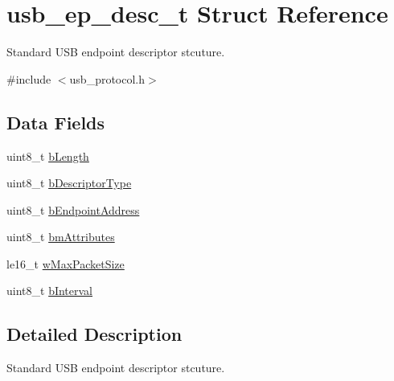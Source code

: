 \hypertarget{structusb__ep__desc__t}{
\section{usb\-\_\-ep\-\_\-desc\-\_\-t \-Struct \-Reference}
\label{structusb__ep__desc__t}
}


\-Standard \-U\-S\-B endpoint descriptor stcuture.  




{\ttfamily \#include $<$usb\-\_\-protocol.\-h$>$}

\subsection*{\-Data \-Fields}
\begin{DoxyCompactItemize}
\item 
uint8\-\_\-t \hyperlink{structusb__ep__desc__t_a1b1f36413d7701c85786390adc914671}{b\-Length}
\item 
uint8\-\_\-t \hyperlink{structusb__ep__desc__t_ae881cfe829a29de12aea7dcc64c84d76}{b\-Descriptor\-Type}
\item 
uint8\-\_\-t \hyperlink{structusb__ep__desc__t_ae72d2c478693d43712626763e1b9f311}{b\-Endpoint\-Address}
\item 
uint8\-\_\-t \hyperlink{structusb__ep__desc__t_ae4a54c991f53573380f4500395ed2e1a}{bm\-Attributes}
\item 
le16\-\_\-t \hyperlink{structusb__ep__desc__t_a7224435989a3b19385f6c37f9e606313}{w\-Max\-Packet\-Size}
\item 
uint8\-\_\-t \hyperlink{structusb__ep__desc__t_aa1dac2219f2a658d66e768f138604f1c}{b\-Interval}
\end{DoxyCompactItemize}


\subsection{\-Detailed \-Description}
\-Standard \-U\-S\-B endpoint descriptor stcuture. 


